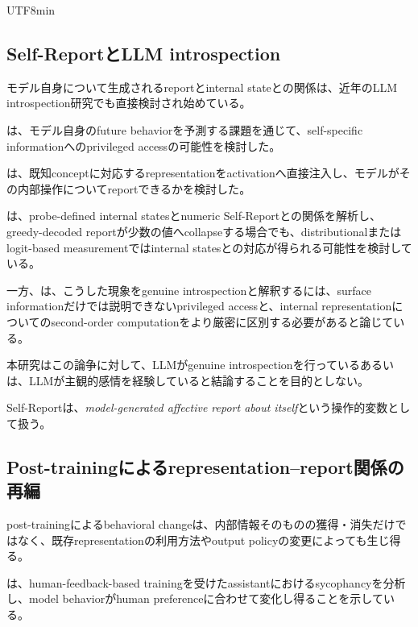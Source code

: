 \documentclass{article} %
\begin{document}
\begin{CJK*}{UTF8}{min}
\subsection{Self-ReportとLLM introspection}

モデル自身について生成されるreportとinternal stateとの関係は、近年のLLM introspection研究でも直接検討され始めている。

\citet{binder2025looking}は、モデル自身のfuture behaviorを予測する課題を通じて、self-specific informationへのprivileged accessの可能性を検討した\citep{binder2025looking}。

\citet{lindsey2026emergent}は、既知conceptに対応するrepresentationをactivationへ直接注入し、モデルがその内部操作についてreportできるかを検討した\citep{lindsey2026emergent}。

\citet{martorell2026quantitative}は、probe-defined internal statesとnumeric Self-Reportとの関係を解析し、greedy-decoded reportが少数の値へcollapseする場合でも、distributionalまたはlogit-based measurementではinternal statesとの対応が得られる可能性を検討している\citep{martorell2026quantitative}。

一方、\citet{singh2026can}は、こうした現象をgenuine introspectionと解釈するには、surface informationだけでは説明できないprivileged accessと、internal representationについてのsecond-order computationをより厳密に区別する必要があると論じている\citep{singh2026can}。

本研究はこの論争に対して、LLMがgenuine introspectionを行っているあるいは、LLMが主観的感情を経験していると結論することを目的としない。

Self-Reportは、\textit{model-generated affective report about itself}という操作的変数として扱う。


\subsection{Post-trainingによるrepresentation--report関係の再編}

post-trainingによるbehavioral changeは、内部情報そのものの獲得・消失だけではなく、既存representationの利用方法やoutput policyの変更によっても生じ得る。

\citet{sharma2024towards}は、human-feedback-based trainingを受けたassistantにおけるsycophancyを分析し、model behaviorがhuman preferenceに合わせて変化し得ることを示している\citep{sharma2024towards}。


\end{CJK*}
\end{document}
